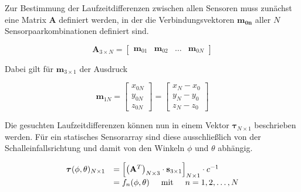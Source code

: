Zur Bestimmung der Laufzeitdifferenzen zwischen allen Sensoren muss zunächst eine Matrix $\mathbf{A}$ definiert werden, in der die Verbindungsvektoren $\mathbf{m_{0n}}$ aller $N$ Sensorpaarkombinationen definiert sind.

\begin{equation}
    \mathbf{A}_{3 \times N} = 
    \begin{bmatrix}
        \mathbf{m}_{01} & \mathbf{m}_{02} & \dots & \mathbf{m}_{0N}    \end{bmatrix}
\end{equation}



Dabei gilt für $\mathbf{m}_{3 \times 1}$ der Ausdruck

\begin{equation}
    \mathbf{m}_{1N} = 
    \begin{bmatrix}
       x_{0N} \\
       y_{0N} \\
       z_{0N}
    \end{bmatrix}
    =
    \begin{bmatrix}
       x_{N} - x_0 \\
       y_{N} - y_0 \\
       z_{N} - z_0
    \end{bmatrix}
\end{equation}

Die gesuchten Laufzeitdifferenzen können nun in einem Vektor $\boldsymbol{\tau}_{N \times 1}$ beschrieben werden. Für ein statisches Sensorarray sind diese ausschließlich von der Schalleinfallsrichtung und damit von den Winkeln $\phi$ und $\theta$ abhängig.

\begin{equation}\label{eq:DOA_winkel}
    \begin{array}{ll}
        \boldsymbol{\tau}(\phi, \theta)_{N \times 1} & =  \left[ \left( \mathbf{A}^T \right)_{N \times 3} \cdot \mathbf{s}_{3 \times 1} \right]_{N \times 1} \cdot c^{-1} \\
                                                     & = f_n(\phi, \theta) \hspace{0.5cm} \text{mit} \hspace{0.5cm} n = 1,2, \dots, N
    \end{array}
\end{equation}

